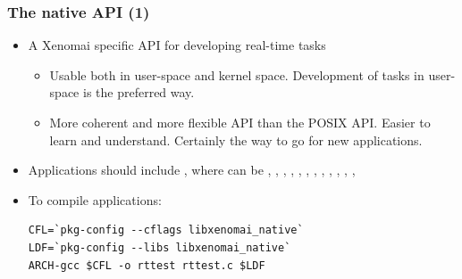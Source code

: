 \begin{frame}[fragile]
  \frametitle{The native API (1)}
  \begin{itemize}
  \item A Xenomai specific API for developing real-time tasks
    \begin{itemize}
    \item Usable both in user-space and kernel space. Development of
      tasks in user-space is the preferred way.
    \item More coherent and more flexible API than the POSIX
      API. Easier to learn and understand. Certainly the way to go for
      new applications.
    \end{itemize}
  \item Applications should include  , where
     can be , , ,
    , , , , ,
    , , , , 
  \item To compile applications:
    \begin{block}{}
\small
\begin{verbatim}
CFL=`pkg-config --cflags libxenomai_native`
LDF=`pkg-config --libs libxenomai_native`
ARCH-gcc $CFL -o rttest rttest.c $LDF
\end{verbatim}
\normalsize
    \end{block}
  \end{itemize}
\end{frame}

